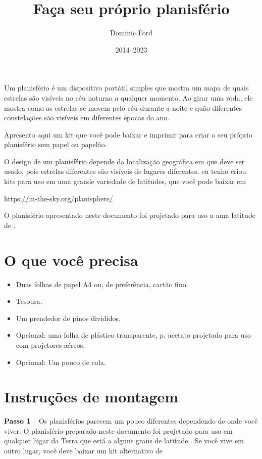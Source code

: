 \documentclass[a4paper,onecolumn,10pt]{article}
\title{Faça seu próprio planisfério}
\author{Dominic Ford}
\date{2014--2023}
\begin{document}
\maketitle
\setcounter{footnote}{1}

Um planisfério é um dispositivo portátil simples que mostra um mapa de quais estrelas 
são visíveis no céu noturno a qualquer momento. Ao girar uma roda, ele mostra
como as estrelas se movem pelo céu durante a noite e quão diferentes
constelações são visíveis em diferentes épocas do ano.

Apresento aqui um kit que você pode baixar e imprimir para criar o seu próprio
planisfério sem papel ou papelão.

O design de um planisfério depende da localização geográfica em que deve
ser usado, pois estrelas diferentes são visíveis de lugares diferentes. eu tenho
criou kits para uso em uma grande variedade de latitudes, que você pode baixar em

\url{https://in-the-sky.org/planisphere/}

O planisfério apresentado neste documento foi projetado para uso a uma latitude de
.
 
\section*{O que você precisa}

\begin{itemize}
\item Duas folhas de papel A4 ou, de preferência, cartão fino.
\item Tesoura.
\item Um prendedor de pinos divididos.
\item Opcional: uma folha de plástico transparente, p. acetato projetado para uso 
com projetores aéreos.
\item Opcional: Um pouco de cola.
\end{itemize}

\section*{Instruções de montagem}

{\bf Passo 1} -- Os planisférios parecem um pouco diferentes dependendo de onde você 
viver. O planisfério preparado neste documento foi projetado para uso em qualquer 
lugar da Terra que está a alguns graus de latitude . Se você vive
em outro lugar, você deve baixar um kit alternativo de
\end{document}
